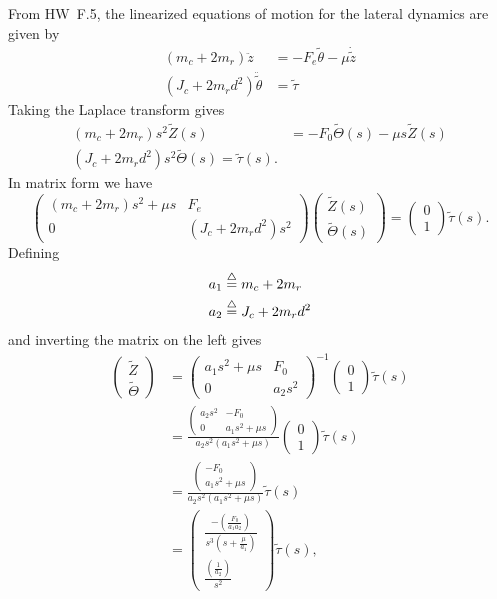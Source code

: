 From HW~F.5, the linearized equations of motion for the lateral dynamics are given by
\begin{align*}
(m_c+2m_r)\ddot{z} &= -F_e\tilde{\theta} - \mu\dot{\tilde{z}} \\
(J_c + 2 m_r d^2)\ddot{\tilde{\theta}} &= \tilde{\tau}
\end{align*}
Taking the Laplace transform gives
\begin{align}
\left( m_c + 2 m_r \right) s^2 \tilde{Z}(s) &= -F_0 \tilde{\Theta}(s) - \mu s \tilde{Z}(s) \label{eq:soln_g6_3}\\
\left( J_c + 2 m_r d^2 \right) s^2 \tilde{\Theta}(s) = \tilde{\tau}(s). \label{eq:soln_g6_4}
\end{align}
In matrix form we have
\[
\begin{pmatrix}
\left( m_c + 2 m_r \right) s^2 +\mu s & F_e \\
0 &  \left( J_c + 2 m_r d^2 \right) s^2
\end{pmatrix} \begin{pmatrix} \tilde{Z}(s) \\ \tilde{\Theta}(s) \end{pmatrix} 
= \begin{pmatrix}
0 \\ 1
\end{pmatrix} \tilde{\tau}(s).
\]
Defining
\begin{align*}
a_1 &\stackrel{\triangle}{=} m_c + 2 m_r \\
a_2 &\stackrel{\triangle}{=} J_c + 2 m_r d^2
\end{align*}
and inverting the matrix on the left gives
\begin{align*}
\begin{pmatrix}\tilde{Z} \\ \tilde{\Theta} \end{pmatrix}
&= \begin{pmatrix}
	a_1 s^2 + \mu s & F_0 \\ 0 & a_2 s^2 \end{pmatrix}^{-1} \begin{pmatrix} 0 \\ 1 \end{pmatrix}\tilde{\tau}(s) \\
&= \frac{\begin{pmatrix}
	a_2 s^2 & -F_0 \\ 0 & a_1 s^2 + \mu s\end{pmatrix}}{a_2s^2(a_1s^2+\mu s)} \begin{pmatrix} 0 \\ 1 \end{pmatrix} \tilde{\tau}(s) \\
&= \frac{\begin{pmatrix} -F_0 \\ a_1 s^2 + \mu s \end{pmatrix}}{a_2s^2(a_1s^2+\mu s)}\tilde{\tau}(s) \\
&= \begin{pmatrix} \frac{-\left(\frac{F_0}{a_1a_2}\right)}{s^3(s+\frac{\mu}{a_1})} \\ \frac{\left(\frac{1}{a_2}\right)}{s^2}\end{pmatrix}\tilde{\tau}(s),
\end{align*}

